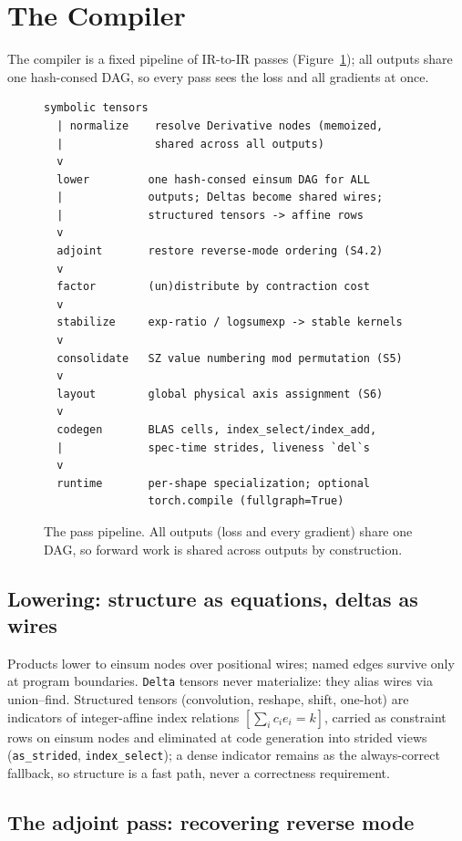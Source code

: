 \documentclass[sigplan,10pt,review]{acmart}
\begin{document}
\section{The Compiler}\label{sec:compiler}

The compiler is a fixed pipeline of IR-to-IR passes
(Figure~\ref{fig:pipeline}); all outputs share one hash-consed DAG, so
every pass sees the loss and all gradients at once.

\begin{figure}
\begin{verbatim}
symbolic tensors
  | normalize    resolve Derivative nodes (memoized,
  |              shared across all outputs)
  v
  lower         one hash-consed einsum DAG for ALL
  |             outputs; Deltas become shared wires;
  |             structured tensors -> affine rows
  v
  adjoint       restore reverse-mode ordering (S4.2)
  v
  factor        (un)distribute by contraction cost
  v
  stabilize     exp-ratio / logsumexp -> stable kernels
  v
  consolidate   SZ value numbering mod permutation (S5)
  v
  layout        global physical axis assignment (S6)
  v
  codegen       BLAS cells, index_select/index_add,
  |             spec-time strides, liveness `del`s
  v
  runtime       per-shape specialization; optional
                torch.compile (fullgraph=True)
\end{verbatim}
\caption{The pass pipeline. All outputs (loss and every gradient) share
one DAG, so forward work is shared across outputs by construction.}
\label{fig:pipeline}
\end{figure}

\subsection{Lowering: structure as equations, deltas as wires}

Products lower to einsum nodes over positional wires; named edges survive
only at program boundaries. \texttt{Delta} tensors never materialize:
they alias wires via union--find. Structured tensors (convolution,
reshape, shift, one-hot) are indicators of integer-affine index relations
$[\sum_i c_i e_i = k]$, carried as constraint rows on einsum nodes and
eliminated at code generation into strided views (\texttt{as\_strided},
\texttt{index\_select}); a dense indicator remains as the always-correct
fallback, so structure is a fast path, never a correctness requirement.

\subsection{The adjoint pass: recovering reverse mode}\label{sec:adjoint}
\end{document}
